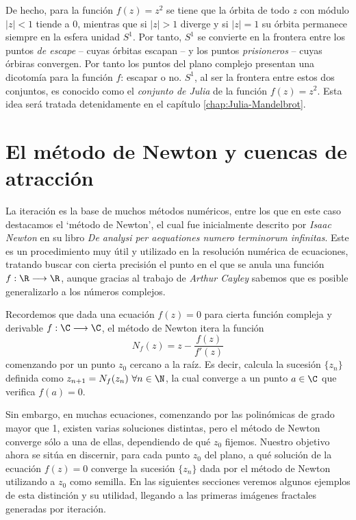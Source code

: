 De hecho, para la función $f(z)=z^2$ se tiene que la órbita de todo $z$ con módulo $|z|<1$ tiende a $0$, mientras que si $|z|>1$ diverge y si $|z|=1$ su órbita permanece siempre en la esfera unidad $S^1$. Por tanto, $S^1$ se convierte en la frontera entre los puntos \textit{de escape} -- cuyas órbitas escapan -- y los puntos \textit{prisioneros} -- cuyas órbiras convergen. Por tanto los puntos del plano complejo presentan una dicotomía para la función $f$: escapar o no. $S^1$, al ser la frontera entre estos dos conjuntos, es conocido como el \textit{conjunto de Julia} de la función $f(z)=z^2$. Esta idea será tratada detenidamente en el capítulo \ref{chap:Julia-Mandelbrot}.

\section{El método de Newton y cuencas de atracción}

La iteración es la base de muchos métodos numéricos, entre los que en este caso destacamos el `método de Newton', el cual fue inicialmente descrito por \textit{Isaac Newton} en su libro \textit{De analysi per aequationes numero terminorum infinitas}. Este es un procedimiento muy útil y utilizado en la resolución numérica de ecuaciones, tratando buscar con cierta precisión el punto en el que se anula una función $f:\R\longrightarrow\R$, aunque gracias al trabajo de \textit{Arthur Cayley} sabemos que es posible generalizarlo a los números complejos.

Recordemos que dada una ecuación $f(z)=0$ para cierta función compleja y derivable $f:\C\longrightarrow\C$, el método de Newton itera la función
\begin{equation}
    \label{eq:metodo-Newton}
    N_f(z)=z-\frac{f(z)}{f'(z)}
\end{equation} 
comenzando por un punto $z_0$ cercano a la raíz. Es decir, calcula la sucesión $\{z_n\}$ definida como $z_{n+1}=N_f(z_n) \ \forall n\in\N$, la cual converge a un punto $a\in\C$ que verifica $f(a)=0$.

Sin embargo, en muchas ecuaciones, comenzando por las polinómicas de grado mayor que 1, existen varias soluciones distintas, pero el método de Newton converge sólo a una de ellas, dependiendo de qué $z_0$ fijemos. Nuestro objetivo ahora se sitúa en discernir, para cada punto $z_0$ del plano, a qué solución de la ecuación $f(z)=0$ converge la sucesión $\{z_n\}$ dada por el método de Newton utilizando a $z_0$ como semilla. En las siguientes secciones veremos algunos ejemplos de esta distinción y su utilidad, llegando a las primeras imágenes fractales generadas por iteración.


